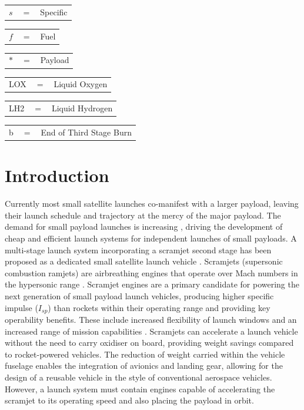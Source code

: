 \documentclass[]{aiaa-tc}
\begin{document}
		\begin{tabular}{p{1.2cm}p{1cm}p{5cm}}
	$s$ & $=$ & Specific\\
		\end{tabular} 
		\begin{tabular}{p{1.2cm}p{1cm}p{5cm}}
	$f$ & $=$ & Fuel\\
\end{tabular} 
\begin{tabular}{p{1.2cm}p{1cm}p{5cm}}
	$\ast$ & $=$ & Payload\\
\end{tabular} 
\begin{tabular}{p{1.2cm}p{1cm}p{5cm}}
	LOX & $=$ & Liquid Oxygen\\
\end{tabular} 
\begin{tabular}{p{1.2cm}p{1cm}p{5cm}}
	LH2 & $=$ & Liquid Hydrogen\\
	
\end{tabular} 
\begin{tabular}{p{1.2cm}p{1cm}p{5cm}}
	b & $=$ & End of Third Stage Burn\\
	
\end{tabular} 
\newpage
\section{Introduction}






Currently most small satellite launches co-manifest with a larger payload, leaving their launch schedule and trajectory at the mercy of the major payload. The  demand for small payload launches is increasing \cite{Faa&Ast&Comstac2015}, driving the development of cheap and efficient launch systems for independent launches of small payloads. 
A multi-stage launch system incorporating a scramjet second stage has been proposed as a dedicated small satellite launch vehicle \cite{Smart2009a}. 
Scramjets (supersonic combustion ramjets) are airbreathing engines that operate over Mach numbers in the hypersonic  range \cite{HeiserWilliamPratt1994}. 
Scramjet engines are a primary candidate for powering the next generation of small payload launch vehicles, producing higher specific impulse ($I_{sp}$)  than rockets within their operating range and providing key operability benefits. These include increased flexibility of launch windows and an increased range of mission capabilities \cite{Flaherty2010}. 
Scramjets can accelerate a launch vehicle without the need to carry oxidiser on board, providing weight savings compared to rocket-powered vehicles. 
 The reduction of weight carried within the vehicle fuselage enables the integration of avionics and landing gear, allowing for the design of a reusable vehicle in the style of conventional aerospace vehicles. 
However, a launch system must contain engines capable of accelerating the scramjet to its operating speed and also placing the payload in orbit. 
\end{document}
